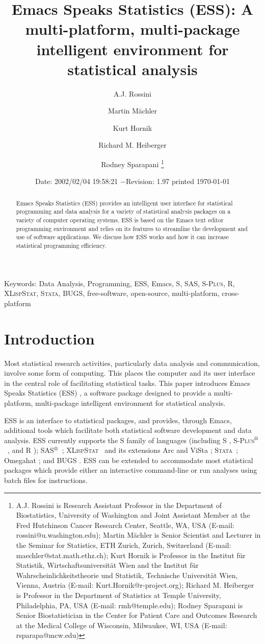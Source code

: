 \documentclass{article}
\title{Emacs Speaks Statistics (ESS): A multi-platform, multi-package
intelligent environment for statistical analysis}
\author{A.J. Rossini \and Martin M{\"a}chler \and Kurt Hornik \and Richard
  M. Heiberger \and Rodney Sparapani \footnote{%
    A.J. Rossini is Research Assistant Professor in the Department of
    Biostatistics, University of Washington and Joint Assistant Member at
    the Fred Hutchinson Cancer Research Center, Seattle, WA, USA
    (E-mail: rossini@u.washington.edu);
    Martin M{\"a}chler is Senior Scientist and Lecturer in the Seminar for
    Statistics, ETH Zurich, Zurich, Switzerland
    (E-mail: maechler@stat.math.ethz.ch);
    Kurt Hornik is Professor in the Institut f{\"u}r Statistik,
    Wirtschaftsuniversit{\"a}t Wien and the Institut f{\"u}r
    Wahrscheinlichkeitstheorie und Statistik, Technische Universit{\"a}t
    Wien, Vienna, Austria (E-mail: Kurt.Hornik@r-project.org);
    Richard M. Heiberger is Professor in the Department of Statistics at
    Temple University, Philadelphia, PA, USA (E-mail: rmh@temple.edu);
    Rodney Sparapani is Senior Biostatistician in the Center for Patient
    Care and Outcomes Research at the Medical College of Wisconsin, 
    Milwaukee, WI, USA (E-mail: rsparapa@mcw.edu)}}
\date{$ $Date: 2002/02/04 19:58:21 $ - $Revision: 1.97 $ $\tiny printed \today}
\newif\ifdraft
\renewcommand{\baselinestretch}{1.5}
\newcommand*{\regstrd}{$^{\mbox{\scriptsize{\textregistered}}}$}
\newcommand*{\SAS}{\textsc{SAS}}
\newcommand*{\Splus}{\textsc{S-Plus}}
\newcommand*{\XLispStat}{\textsc{XLispStat}}
\newcommand*{\Stata}{\textsc{Stata}}
\begin{document}

\ifdraft
\setcounter{page}{0}
\tableofcontents
\fi

\maketitle

\ifdraft{}%
\else%
 \renewcommand{\baselinestretch}{1.5}
\fi

\begin{abstract}
  Emacs Speaks Statistics (ESS) provides an intelligent user
  interface for statistical programming and data analysis 
  for a variety of statistical analysis packages on a
  variety of computer operating systems.  ESS is based on the Emacs
  text editor programming environment and relies 
  on its features to streamline the development and use of
  software applications.  We discuss how ESS works and how
  it can increase statistical programming efficiency.
\end{abstract}

\noindent Keywords: Data Analysis, Programming, ESS, Emacs, S, \SAS,
\Splus, R, \XLispStat, \Stata, BUGS, free-software, open-source,
multi-platform, cross-platform


\section{Introduction}
\label{sec:introduction}

Most statistical research activities, particularly data analysis and
communication, involve some form of computing.  This places the
computer and its user interface in the central role of facilitating
statistical tasks.  This paper introduces Emacs Speaks Statistics
(ESS) \citep{ESS}, a software package designed to provide a
multi-platform, multi-package intelligent environment for statistical
analysis.

ESS is an interface to statistical packages, and provides, through
Emacs, additional tools which facilitate both statistical software
development and data analysis.  ESS currently supports the S family of
languages (including S \citep{BecRCW88,ChaJH92,ChaJ98},
\Splus\regstrd\ \citep{Splus}, and R \citep{ihak:gent:1996});
\SAS\regstrd\ \citep{SAS:8}; \XLispStat\ \citep{Tier90} and its
extensions Arc \citep{Cook:Weisberg:1999} and ViSta
\citep{youn:fald:mcfa:1992}; \Stata\ \citep{Stata:6.0}; Omegahat
\citep{DTLang:2000}; and BUGS \citep{BUGS}.  ESS can be extended to
accommodate most statistical packages which provide either an
interactive command-line or run analyses using batch files for
instructions.
\end{document}
